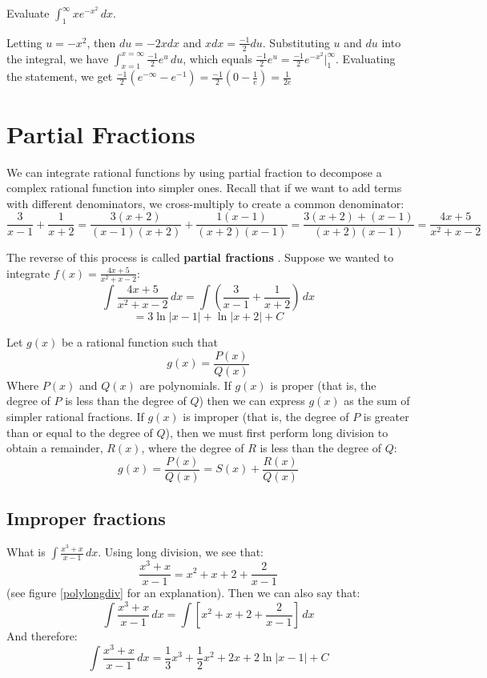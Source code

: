 \begin{Exercise}[label=int_meth4]
Evaluate $\int_1^{\infty}xe^{-x^2}\,dx$. 
\end{Exercise}

\begin{Answer}[ref=int_meth4]
Letting $u = -x^2$, then $du = -2x dx$ and $x dx = \frac{-1}{2}du$. 
Substituting $u$ and $du$ into the integral, we have $\int_{x = 1}^{x 
= \infty} \frac{-1}{2}e^u\,du$, which equals $\frac{-1}{2}e^u = 
\frac{-1}{2}e^{-x^2}|_1^{\infty}$. Evaluating the statement, we get 
$\frac{-1}{2}(e^{-\infty} - e^{-1}) = \frac{-1}{2}(0-\frac{1}{e}) = 
\frac{1}{2e}$
\end{Answer}


\section{Partial Fractions}
We can integrate rational functions by using partial fraction to decompose a 
complex rational function into simpler ones. Recall that if we want to add 
terms with different denominators, we cross-multiply to create a common 
denominator:
$$\frac{3}{x - 1} + \frac{1}{x + 2} = \frac{3 (x + 2) }{(x - 1) (x + 2)} + 
\frac{1 (x - 1) }{(x + 2) (x - 1)} = \frac{3 (x + 2) + (x - 1)}{(x + 2) (x - 1)} 
= \frac{4x + 5}{x^2 + x - 2}$$

The reverse of this process is called \textbf{partial fractions} 
. Suppose we wanted to integrate $f(x) = \frac{4x + 5}
{x^2 + x - 2}$:
$$\int \frac{4x + 5}{x^2 + x - 2}\,dx = \int \left( \frac{3}{x - 1} + \frac{1}{
x + 2} \right)\,dx$$
$$= 3\ln{|x - 1|} + \ln{|x + 2|} + C$$

Let $g(x)$ be a rational function such that 
$$g(x) = \frac{P(x)}{Q(x)}$$
Where $P(x)$ and $Q(x)$ are polynomials. If $g(x)$ is proper (that is, the degree of $P$ is less than the degree of $Q$) then we can express $g(x)$ as the sum of simpler rational fractions. If $g(x)$ is improper (that is, the degree of $P$ is greater than or equal to the degree of $Q$), then we must first perform long division to obtain a remainder, $R(x)$, where the degree of $R$ is less than the degree of $Q$:
$$g(x) = \frac{P(x)}{Q(x)} = S(x) + \frac{R(x)}{Q(x)}$$

\subsection{Improper fractions}
What is $\int \frac{x^3 + x}{x-1}\,dx$. Using long division, we see that:
$$\frac{x^3 + x}{x - 1} = x^2 + x + 2 + \frac{2}{x - 1}$$
(see figure \ref{polylongdiv} for an explanation). Then we can also say that:
$$\int \frac{x^3 + x}{x-1}\,dx = \int \left[x^2 + x + 2 + \frac{2}{x-1} \right]\,dx$$
And therefore:
$$\int \frac{x^3 + x}{x-1}\,dx = \frac{1}{3}x^3 + \frac{1}{2}x^2 + 2x + 2\ln{|x-1|} + C$$


